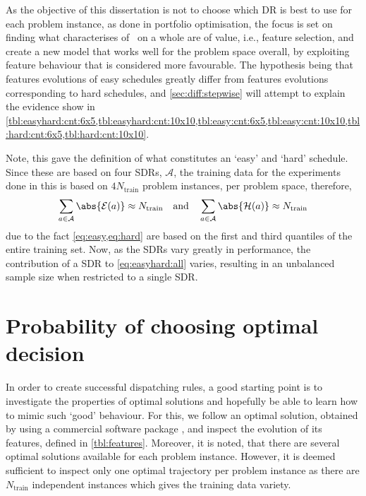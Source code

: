 As the objective of this dissertation is not to choose which DR is best to use for each problem instance, as done in portfolio optimisation, the focus is set on finding what characterises of \jsp\ on a whole are of value, i.e., feature selection, and create a new model that works well for the problem space overall, by exploiting feature behaviour that is considered more favourable. The hypothesis being that features evolutions of easy schedules greatly differ from features evolutions corresponding to hard schedules, and \cref{sec:diff:stepwise} will attempt to explain the evidence show in \cref{tbl:easyhard:cnt:6x5,tbl:easyhard:cnt:10x10,tbl:easy:cnt:6x5,tbl:easy:cnt:10x10,tbl:hard:cnt:6x5,tbl:hard:cnt:10x10}.

Note, this  gave the definition of what constitutes an `easy' and `hard' schedule. Since these are based on four SDRs, $\mathcal{A}$, the training data for the experiments done in this  is based on $4N_{\text{train}}$ problem instances, per problem space, therefore,
\begin{equation}\label{eq:easyhard:all}
\sum_{a\in\mathcal{A}}\abs{\mathcal{E}(a)} \approx N_{\text{train}}
\quad\text{and}\quad
\sum_{a\in\mathcal{A}}\abs{\mathcal{H}(a)} \approx N_{\text{train}}
\end{equation} 
due to the fact \cref{eq:easy,eq:hard} are based on the first and third quantiles of the entire training set.
Now, as the SDRs vary greatly in performance, the contribution of a SDR to \cref{eq:easyhard:all} varies, resulting in an unbalanced sample size when restricted to a single SDR. 


{\setlength{\tabcolsep}{3pt}






}


\section{Probability of choosing optimal decision}\label{sec:diff:opt:rnd}
In order to create successful dispatching rules, a good starting point is to investigate the properties of optimal solutions and hopefully be able to learn how to mimic such `good' behaviour. For this, we follow an optimal solution, obtained by using a commercial software package \cite{gurobi}, and inspect the evolution of its features, defined in \cref{tbl:features}. Moreover, it is noted, that there are several optimal solutions available for each problem instance. However, it is deemed sufficient to inspect only one optimal trajectory per problem instance as there are $N_{\text{train}}$ independent instances which gives the training data variety. 

